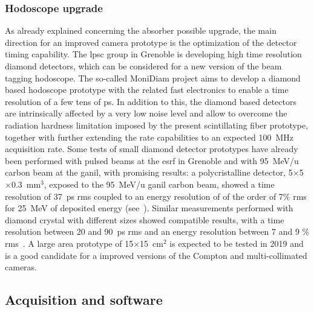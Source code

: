 \subsubsection{Hodoscope upgrade}\label{chap3::subsubsec::hodoUpgrade} 

As already explained concerning the absorber possible upgrade, the main direction for an improved camera prototype is the optimization of the detector timing capability. The \gls{lpsc} group in Grenoble is developing high time resolution diamond detectors, which can be considered for a new version of the beam tagging hodoscope. The so-called MoniDiam project aims to develop a diamond based hodoscope prototype with the related fast electronics to enable a time resolution of a few tens of ps. In addition to this, the diamond based detectors are intrinsically affected by a very low noise level and allow to overcome the radiation hardness limitation imposed by the present scintillating fiber prototype, together with further extending the rate capabilities to an expected 100~MHz acquisition rate. Some tests of small diamond detector prototypes have already been performed with pulsed beams at the \gls{esrf} in Grenoble and with 95~MeV/u carbon beam at the \gls{ganil}, with promising results: a polycristalline detector, 5$\times$5$\times$0.3~mm$^3$, exposed to the 95~MeV/u \gls{ganil} carbon beam, showed a time resolution of 37~ps \gls{rms} coupled to an energy resolution of of the order of 7\% \gls{rms} for 25~MeV of deposited energy (see~\cite{Gallin-Martel2016}). Similar measurements performed with diamond crystal with different sizes showed compatible results, with a time resolution between 20 and 90~ps \gls{rms} and an energy resolution between 7 and 9 \% \gls{rms}~\parencite{Gallin-Martel2018}. A large area prototype of 15$\times$15~cm$^{2}$ is expected to be tested in 2019 and is a good candidate for a improved versions of the Compton and multi-collimated cameras.

\subsection{Acquisition and software}\label{chap3::subsec::daqNext}

